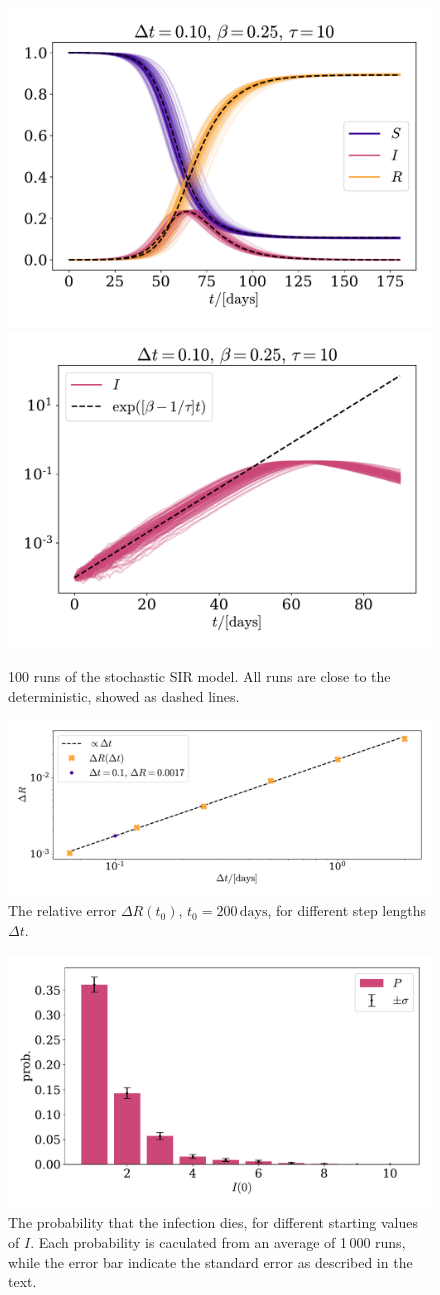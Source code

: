 \documentclass{article}
\begin{document}
    \begin{figure}[H]
        \centering
        \includegraphics[width=.49\textwidth]{../plots/2B/TestSIR_stoch.pdf}
        \includegraphics[width=.49\textwidth]{../plots/2B/TestI_stoch.pdf}
        \caption{100 runs of the stochastic SIR model. All runs are close to the deterministic, showed as dashed lines.}
        \label{stochastic SIR}
    \end{figure}

    \begin{figure}[H]
        \centering
        \includegraphics[width=.7\textwidth]{../plots/2B/conv.pdf}
        \caption{The relative error $\Delta R(t_0)$, $t_0=200 \, \mathrm{ days }$, for different step lengths $\Delta t$.}
        \label{conv}
    \end{figure}


    \begin{figure}[H]
        \centering
        \includegraphics[width=.7\textwidth]{../plots/2B/disappear.pdf}
        \caption{The probability that the infection dies, for different starting values of $I$. Each probability is caculated from an average of 1\,000 runs, while the error bar indicate the standard error as described in the text.}
        \label{Disappear}
    \end{figure}
\end{document}
